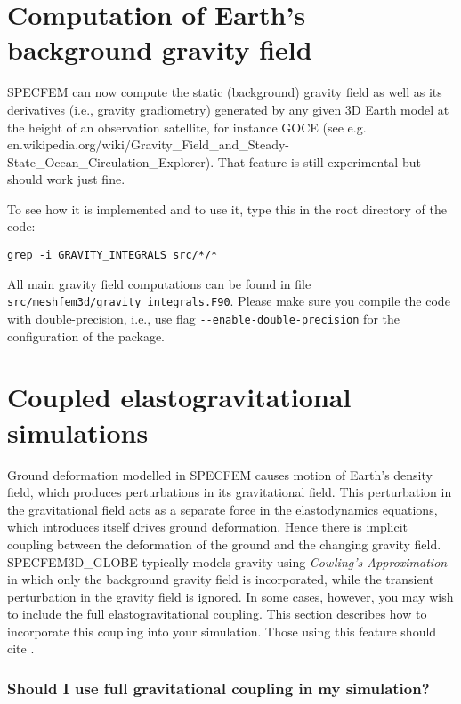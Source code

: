 
\chapter{Computation of Earth's background gravity field}

SPECFEM can now compute the static (background) gravity field as well as its derivatives (i.e., gravity gradiometry)
generated by any given 3D Earth model at the height
of an observation satellite, for instance GOCE\newline
(see e.g. en.wikipedia.org/wiki/Gravity\_Field\_and\_Steady-State\_Ocean\_Circulation\_Explorer).\newline
That feature is still experimental but should work just fine.\newline


\noindent
To see how it is implemented and to use it, type this in the root directory of the code:
\begin{verbatim}
grep -i GRAVITY_INTEGRALS src/*/*
\end{verbatim}
All main gravity field computations can be found in file \texttt{src/meshfem3d/gravity\_integrals.F90}.
Please make sure you compile the code with double-precision, i.e., use flag \texttt{{-}{-}enable-double-precision} for the
configuration of the package.


\chapter{Coupled elastogravitational simulations}

Ground deformation modelled in SPECFEM causes motion of Earth's density field, which produces perturbations in its 
gravitational field. This perturbation in the gravitational field acts as a separate force in the elastodynamics 
equations, which introduces itself drives ground deformation. Hence there is implicit coupling between the deformation
of the ground and the changing gravity field. SPECFEM3D_GLOBE typically models gravity using \textit{Cowling's Approximation}
in which only the background gravity field is incorporated, while the transient perturbation in the gravity field is 
ignored. In some cases, however, you may wish to include the full elastogravitational coupling. This section describes
how to incorporate this coupling into your simulation. Those using this feature should cite \cite{GhEaTr23}. 

\subsection{Should I use full gravitational coupling in my simulation?}

